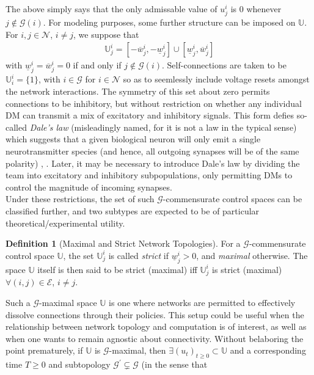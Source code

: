 \documentclass[12pt, oneside]{report}
\newcommand{\mbb}[1]{\mathbb{#1}}
\newcommand{\1}[1]{\mathbbm{1}_{\{#1\}}}
\newcommand{\mc}[1]{\mathcal{#1}}
\theoremstyle{definition}
\newtheorem{definition}[theorem]{Definition}
\begin{document}
The above simply says that the only admissable value of $u^i_j$ is $0$ whenever
$j\notin\mc{G}(i)$. For modeling purposes, some further structure can be
imposed on $\mbb{U}$. For $i,j\in\mc{N}$, $i\neq j$, we suppose that
\begin{align}
    \mbb{U}^i_j=[-\overline{w}^i_j,-\underline{w}^i_j]\cup[\underline{w}^i_j,\overline{w}^i_j]\label{eq93}
\end{align}
with $\underline{w}^i_j=\overline{w}^i_j=0$ if and only if $j\notin\mc{G}(i)$.
Self-connections are taken to be $\mbb{U}^i_i=\{1\}$, with $i\in\mc{G}$ for
$i\in\mc{N}$ so as to seemlessly include voltage resets amongst the network
interactions. The symmetry of this set about zero permits connections to be inhibitory, but without restriction
on whether any individual DM can transmit a mix of excitatory and inhibitory signals. This form defies so-called \textit{Dale's law} (misleadingly named, for it is not a law in the typical sense)
which suggests that a given biological neuron will only emit a single neurotransmitter species (and hence, all outgoing synapses will be of the same polarity) \cite{Osborne_1979}, \cite{Barranca_Bhuiyan_Sundgren_Xing_2022}.
Later, it may be necessary to introduce Dale's law by dividing the team into excitatory and inhibitory subpopulations, only permitting DMs to control the magnitude of incoming synapses.\\[5pt]
\indent Under these restrictions, the set of such $\mc{G}$-commensurate
control spaces can be classified further, and two subtypes are expected to be of
particular theoretical/experimental utility.
\begin{definition}[Maximal and Strict Network Topologies]
    For a $\mc{G}$-commensurate control space $\mbb{U}$, the set $\mbb{U}^i_j$
    is called {\it strict} if $\underline{w}^i_j>0$, and {\it maximal}
    otherwise. The space $\mbb{U}$ itself is then said to be strict (maximal)
    iff $\mbb{U}^i_j$ is strict (maximal) $\forall (i,j)\in\mc{E}$, $i\neq j$.
\end{definition}
Such a $\mc{G}$-maximal space $\mbb{U}$ is one where networks are permitted to
effectively dissolve connections through their policies. This setup could be
useful when the relationship between network topology and computation is of
interest, as well as when one wants to remain agnostic about connectivity.
Without belaboring the point prematurely, if $\mbb{U}$ is $\mc{G}$-maximal, then
$\exists (u_t)_{t\geq 0}\subset\mbb{U}$ and a corresponding time $T\geq 0$ and
subtopology $\mc{G}^\prime\subsetneq\mc{G}$ (in the sense that
\end{document}
